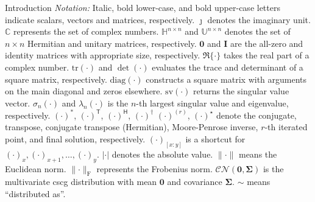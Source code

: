 \documentclass[journal]{IEEEtran}
\begin{document}
\begin{section}{Introduction}
	\emph{Notation:}
	Italic, bold lower-case, and bold upper-case letters indicate scalars, vectors and matrices, respectively.
	$\jmath$ denotes the imaginary unit.
	$\mathbb{C}$ represents the set of complex numbers.
	$\mathbb{H}^{n \times n}$ and $\mathbb{U}^{n \times n}$ denotes the set of $n \times n$ Hermitian and unitary matrices, respectively.
	$\mathbf{0}$ and $\mathbf{I}$ are the all-zero and identity matrices with appropriate size, respectively.
	$\Re\{\cdot\}$ takes the real part of a complex number.
	$\mathrm{tr}(\cdot)$ and $\det(\cdot)$ evaluates the trace and determinant of a square matrix, respectively.
	$\mathrm{diag}(\cdot)$ constructs a square matrix with arguments on the main diagonal and zeros elsewhere.
	$\mathrm{sv}(\cdot)$ returns the singular value vector.
	$\sigma_n(\cdot)$ and $\lambda_n(\cdot)$ is the $n$-th largest singular value and eigenvalue, respectively.
	$(\cdot)^*$, $(\cdot)^\mathsf{T}$, $(\cdot)^\mathsf{H}$, $(\cdot)^\dagger$ $(\cdot)^{(r)}$, $(\cdot)^{\star}$ denote the conjugate, transpose, conjugate transpose (Hermitian), Moore-Penrose inverse, $r$-th iterated point, and final solution, respectively.
	$(\cdot)_{[x:y]}$ is a shortcut for $(\cdot)_x,(\cdot)_{x+1},\ldots,(\cdot)_y$.
	$\lvert \cdot \rvert$ denotes the absolute value.
	$\lVert \cdot \rVert$ means the Euclidean norm.
	$\lVert \cdot \rVert _\mathrm{F}$ represents the Frobenius norm.
	$\mathcal{CN}(\mathbf{0}, \mathbf{\Sigma})$ is the multivariate \gls{cscg} distribution with mean $\mathbf{0}$ and covariance $\mathbf{\Sigma}$.
	$\sim$ means ``distributed as''.
\end{section}
\end{document}
